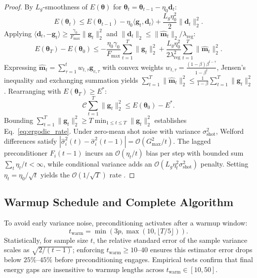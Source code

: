 \documentclass[11pt,a4paper]{article}
\begin{document}
\begin{proof}
By $L_g$-smoothness of $E(\boldsymbol{\theta})$ for $\boldsymbol{\theta}_t = \boldsymbol{\theta}_{t-1} - \eta_0 \mathbf{d}_t$:
\begin{equation}
E(\boldsymbol{\theta}_t) \le E(\boldsymbol{\theta}_{t-1}) - \eta_0 \langle \mathbf{g}_t, \mathbf{d}_t \rangle + \frac{L_g \eta_0^2}{2} \|\mathbf{d}_t\|_2^2.
\end{equation}
Applying $\langle \mathbf{d}_t, -\mathbf{g}_t \rangle \ge \frac{\gamma_0}{F_{\max}} \|\mathbf{g}_t\|_2^2$ and $\|\mathbf{d}_t\|_2 \le \|\hat{\mathbf{m}}_t\|_2 / \lambda_{\text{reg}}$:
\begin{equation}
E(\boldsymbol{\theta}_T) - E(\boldsymbol{\theta}_0) \le -\frac{\eta_0 \gamma_0}{F_{\max}} \sum_{t=1}^T \|\mathbf{g}_t\|_2^2 + \frac{L_g \eta_0^2}{2 \lambda_{\text{reg}}^2} \sum_{t=1}^T \|\hat{\mathbf{m}}_t\|_2^2.
\end{equation}
Expressing $\hat{\mathbf{m}}_t = \sum_{\tau=1}^t w_{t,\tau} \mathbf{g}_{c,\tau}$ with convex weights $w_{t,\tau} = \frac{(1-\beta)\beta^{t-\tau}}{1-\beta^t}$, Jensen's inequality and exchanging summation yields $\sum_{t=1}^T \|\hat{\mathbf{m}}_t\|_2^2 \le \frac{1}{1-\beta} \sum_{t=1}^T \|\mathbf{g}_t\|_2^2$. Rearranging with $E(\boldsymbol{\theta}_T) \ge E^*$:
\begin{equation}
\mathcal{C} \sum_{t=1}^T \|\mathbf{g}_t\|_2^2 \le E(\boldsymbol{\theta}_0) - E^*.
\end{equation}
Bounding $\sum_{t=1}^T \|\mathbf{g}_t\|_2^2 \ge T \min_{1 \le t \le T} \|\mathbf{g}_t\|_2^2$ establishes Eq.~\eqref{eq:ergodic_rate}. Under zero-mean shot noise with variance $\sigma_{\text{shot}}^2$, Welford differences satisfy $|\hat{\sigma}_i^2(t) - \hat{\sigma}_i^2(t-1)| = \mathcal{O}(G_{\max}^2 / t)$. The lagged preconditioner $F_i(t-1)$ incurs an $\mathcal{O}(\eta_t / t)$ bias per step with bounded sum $\sum_t \eta_t / t < \infty$, while conditional variance adds an $\mathcal{O}(L_g \eta_t^2 \sigma_{\text{shot}}^2)$ penalty. Setting $\eta_t = \eta_0 / \sqrt{t}$ yields the $\mathcal{O}(1/\sqrt{T})$ rate \cite{ghadimi2013stochastic}.
\end{proof}

\subsection{Warmup Schedule and Complete Algorithm}
To avoid early variance noise, preconditioning activates after a warmup window:
\begin{equation}
t_{\text{warm}} = \min(3p, \max(10, \lfloor T / 5 \rfloor)).
\label{eq:warmup}
\end{equation}
Statistically, for sample size $t$, the relative standard error of the sample variance scales as $\sqrt{2/(t-1)}$; enforcing $t_{\text{warm}} \ge 10\text{--}40$ ensures this estimator error drops below $25\%\text{--}45\%$ before preconditioning engages. Empirical tests confirm that final energy gaps are insensitive to warmup lengths across $t_{\text{warm}} \in [10, 50]$.
\end{document}
